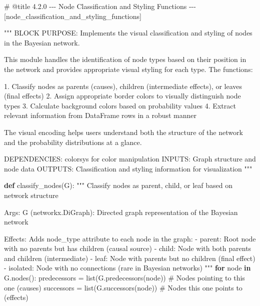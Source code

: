 \documentclass[
  11pt,
  letterpaper,
]{book}
\newenvironment{Shaded}{\begin{snugshade}}{\end{snugshade}}
\newcommand{\BuiltInTok}[1]{\textcolor[rgb]{0.00,0.23,0.31}{#1}}
\newcommand{\CommentTok}[1]{\textcolor[rgb]{0.37,0.37,0.37}{#1}}
\newcommand{\ControlFlowTok}[1]{\textcolor[rgb]{0.00,0.23,0.31}{\textbf{#1}}}
\newcommand{\KeywordTok}[1]{\textcolor[rgb]{0.00,0.23,0.31}{\textbf{#1}}}
\newcommand{\NormalTok}[1]{\textcolor[rgb]{0.00,0.23,0.31}{#1}}
\newcommand{\OperatorTok}[1]{\textcolor[rgb]{0.37,0.37,0.37}{#1}}
\begin{document}
\label{node_classification_and_styling_functions}
\begin{Shaded}
\begin{Highlighting}[]
\CommentTok{\# @title 4.2.0 {-}{-}{-} Node Classification and Styling Functions {-}{-}{-} [node\_classification\_and\_styling\_functions]}

\CommentTok{"""}
\CommentTok{BLOCK PURPOSE: Implements the visual classification and styling of nodes in the Bayesian network.}

\CommentTok{This module handles the identification of node types based on their position in}
\CommentTok{the network and provides appropriate visual styling for each type.}
\CommentTok{The functions:}

\CommentTok{1. Classify nodes as parents (causes), children (intermediate effects), or leaves (final effects)}
\CommentTok{2. Assign appropriate border colors to visually distinguish node types}
\CommentTok{3. Calculate background colors based on probability values}
\CommentTok{4. Extract relevant information from DataFrame rows in a robust manner}

\CommentTok{The visual encoding helps users understand both the structure of the network}
\CommentTok{and the probability distributions at a glance.}

\CommentTok{DEPENDENCIES: colorsys for color manipulation}
\CommentTok{INPUTS: Graph structure and node data}
\CommentTok{OUTPUTS: Classification and styling information for visualization}
\CommentTok{"""}

\KeywordTok{def}\NormalTok{ classify\_nodes(G):}
    \CommentTok{"""}
\CommentTok{    Classify nodes as parent, child, or leaf based on network structure}

\CommentTok{    Args:}
\CommentTok{        G (networkx.DiGraph): Directed graph representation of the Bayesian network}

\CommentTok{    Effects:}
\CommentTok{        Adds \textquotesingle{}node\_type\textquotesingle{} attribute to each node in the graph:}
\CommentTok{        {-} \textquotesingle{}parent\textquotesingle{}: Root node with no parents but has children (causal source)}
\CommentTok{        {-} \textquotesingle{}child\textquotesingle{}: Node with both parents and children (intermediate)}
\CommentTok{        {-} \textquotesingle{}leaf\textquotesingle{}: Node with parents but no children (final effect)}
\CommentTok{        {-} \textquotesingle{}isolated\textquotesingle{}: Node with no connections (rare in Bayesian networks)}
\CommentTok{    """}
    \ControlFlowTok{for}\NormalTok{ node }\KeywordTok{in}\NormalTok{ G.nodes():}
\NormalTok{        predecessors }\OperatorTok{=} \BuiltInTok{list}\NormalTok{(G.predecessors(node))  }\CommentTok{\# Nodes pointing to this one (causes)}
\NormalTok{        successors }\OperatorTok{=} \BuiltInTok{list}\NormalTok{(G.successors(node))      }\CommentTok{\# Nodes this one points to (effects)}


\end{Highlighting}
\end{Shaded}
\end{document}

